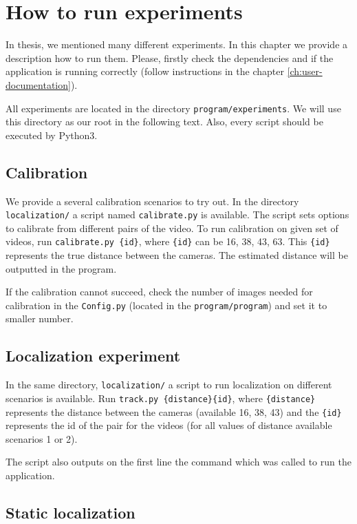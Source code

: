 \chapter{How to run experiments}

In thesis, we mentioned many different experiments. In this chapter we provide
a description how to run them. Please, firstly check the dependencies and if
the application is running correctly (follow instructions in the chapter \ref{ch:user-documentation}).

All experiments are located in the directory \texttt{program/experiments}. We
will use this directory as our root in the following text. Also, every script
should be executed by Python3.

\section{Calibration}

We provide a several calibration scenarios to try out. In the directory
\verb+localization/+ a script named \verb+calibrate.py+ is
available. The script sets options to calibrate from different pairs of the
video. To run calibration on given set of videos, run \verb+calibrate.py {id}+,
where \verb+{id}+ can be 16, 38, 43, 63. This \verb+{id}+ represents the true
distance between the cameras. The estimated distance will be outputted in the
program.

If the calibration cannot succeed, check the number of images needed for
calibration in the \verb+Config.py+ (located in the \verb+program/program+)
and set it to smaller number.

\section{Localization experiment}

In the same directory, \verb+localization/+ a script to run
localization on different scenarios is available. Run \verb+track.py {distance}{id}+, 
where \verb+{distance}+ represents the distance between the cameras
(available 16, 38, 43) and the \verb+{id}+ represents the id of the pair for the
videos (for all values of distance available scenarios 1 or 2).

The script also outputs on the first line the command which was called to run
the application.

\section{Static localization}


